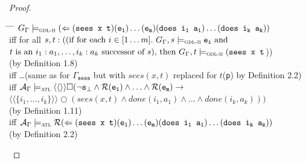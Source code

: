 \documentclass{article}
\theoremstyle{theorem}
\theoremstyle{lemma}
\theoremstyle{definition}
\theoremstyle{remark}
\begin{document}
\begin{proof}
    \begin{tabbing}
    \hspace{1.2cm} \= \hspace{1cm} \= \hspace{0.5cm} \= \kill
    \> $G_\Gamma \models_\textsc{gdl-ii}(\Leftarrow(\texttt{sees x t}) (\texttt{e\textsubscript{1}}) \ldots(\texttt{e\textsubscript{m}}) (\texttt{does i\textsubscript{1} a\textsubscript{1}}) \ldots(\texttt{does i\textsubscript{k} a\textsubscript{k}}))$ \\
    \>\> iff for all $s,t:((\text{if for each } i \in [1\ldots m].\ G_\Gamma, s \models_\textsc{gdl-ii} \texttt{e\textsubscript{i}}\text{ and }$ \\
    \>\>\> $t \text{ is an } i_1:a_1,\ldots,i_k:a_k \text{ successor of }s)\text{, then } G_\Gamma,t \models_\textsc{gdl-ii} (\texttt{sees x t}$)) \\
    \>\>\> (by Definition 1.8) \\
    \>\> iff \ldots (same as for $\Gamma_\texttt{sees}$ but with $sees(x,t)$ replaced for $t$(\texttt{p}) by Definition 2.2) \\
    \>\> iff $\mathcal{A}_\Gamma \models_\textsc{atl} \langle \langle \rangle \rangle \square (\neg \texttt{s}_\bot \wedge \mathcal{R}(\texttt{e\textsubscript{1}}) \wedge \ldots \wedge \mathcal{R}(\texttt{e\textsubscript{m}}) \rightarrow$ \\
    \>\>\> $\langle \langle \{i_1,\ldots ,i_k\} \rangle \rangle \bigcirc (sees(x,t) \wedge done(i_1,a_1) \wedge \ldots \wedge done(i_k,a_k)))$ \\ 
    \>\>\> (by Definition 1.11) \\
    \>\> iff $\mathcal{A}_\Gamma \models_\textsc{atl} \mathcal{R}(\Leftarrow(\texttt{sees x t}) (\texttt{e\textsubscript{1}}) \ldots(\texttt{e\textsubscript{m}}) (\texttt{does i\textsubscript{1} a\textsubscript{1}}) \ldots(\texttt{does i\textsubscript{k} a\textsubscript{k}}))$ \\
    \>\>\> (by Definition 2.2)
    \end{tabbing}
\end{proof}
\end{document}
